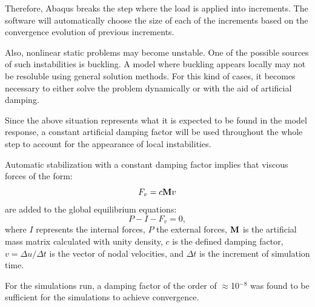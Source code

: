     Therefore, Abaqus breaks the step where the load is applied into increments. The software will automatically choose the size of each of the increments based on the convergence evolution of previous increments.

    Also, nonlinear static problems may become unstable. One of the possible sources of such instabilities is buckling. A model where buckling appears locally may not be resoluble using general solution methods. For this kind of cases, it becomes necessary to either solve the problem dynamically or with the aid of artificial damping.

    Since the above situation represents what it is expected to be found in the model response, a constant artificial damping factor will be used throughout the whole step to account for the appearance of local instabilities.  

    Automatic stabilization with a constant damping factor implies that viscous forces of the form:
    $$
    F_v = c \mathrm{\textbf{M}} v
    $$
    are added to the global equilibrium equations:
    $$
    P - I - F_v = 0,
    $$
    where $I$ represents the internal forces, $P$ the external forces, $\mathrm{\textbf{M}}$ is the artificial mass matrix calculated with unity density, $c$ is the defined damping factor, $v = \Delta u / \Delta t$ is the vector of nodal velocities, and $\Delta t$ is the increment of simulation time.

    For the simulations run, a damping factor of the order of $\approx$10$^{-8}$ was found to be sufficient for the simulations to achieve convergence.

